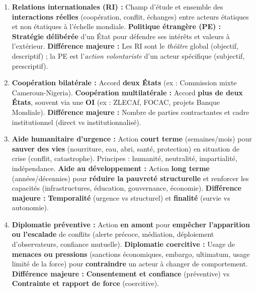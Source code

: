 \documentclass[11pt]{article}
\begin{document}
\begin{corrige}
\begin{enumerate}
    \item \textbf{Relations internationales (RI) :} Champ d'étude et ensemble des \textbf{interactions réelles} (coopération, conflit, échanges) entre acteurs étatiques et non étatiques à l'échelle mondiale. \textbf{Politique étrangère (PE) :} \textbf{Stratégie délibérée} d'un État pour défendre ses intérêts et valeurs à l'extérieur. \textbf{Différence majeure :} Les RI sont le \emph{théâtre} global (objectif, descriptif) ; la PE est l'\emph{action volontariste} d'un acteur spécifique (subjectif, prescriptif).
    \item \textbf{Coopération bilatérale :} Accord \textbf{deux États} (ex : Commission mixte Cameroun-Nigeria). \textbf{Coopération multilatérale :} Accord \textbf{plus de deux États}, souvent via une \textbf{OI} (ex : ZLECAf, FOCAC, projets Banque Mondiale). \textbf{Différence majeure :} Nombre de parties contractantes et cadre institutionnel (direct vs institutionnalisé).
    \item \textbf{Aide humanitaire d'urgence :} Action \textbf{court terme} (semaines/mois) pour \textbf{sauver des vies} (nourriture, eau, abri, santé, protection) en situation de crise (conflit, catastrophe). Principes : humanité, neutralité, impartialité, indépendance. \textbf{Aide au développement :} Action \textbf{long terme} (années/décennies) pour \textbf{réduire la pauvreté structurelle} et renforcer les capacités (infrastructures, éducation, gouvernance, économie). \textbf{Différence majeure :} \textbf{Temporalité} (urgence vs structurel) et \textbf{finalité} (survie vs autonomie).
    \item \textbf{Diplomatie préventive :} Action \textbf{en amont} pour \textbf{empêcher l'apparition ou l'escalade} de conflits (alerte précoce, médiation, déploiement d'observateurs, confiance mutuelle). \textbf{Diplomatie coercitive :} Usage de \textbf{menaces ou pressions} (sanctions économiques, embargo, ultimatum, usage limité de la force) pour \textbf{contraindre} un acteur à changer de comportement. \textbf{Différence majeure :} \textbf{Consentement et confiance} (préventive) vs \textbf{Contrainte et rapport de force} (coercitive).
\end{enumerate}
\end{corrige}
\end{document}
